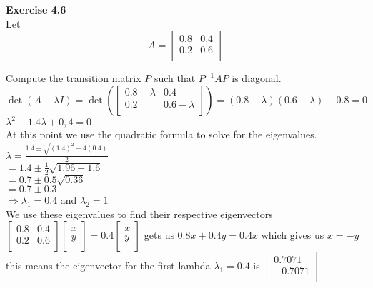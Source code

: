 \documentclass[letterpaper,12pt]{article}
\theoremstyle{definition}
\begin{document}
\textbf{Exercise 4.6}\\

Let \[A = 
\begin{bmatrix}
   0.8 & 0.4 \\
   0.2 & 0.6 \\
  \end{bmatrix} \]
 
 Compute the transition matrix $P$ such that $P^{-1}AP$ is diagonal.\\
 $\det(A -\lambda I) = \det\left(
 \begin{bmatrix}
   0.8 - \lambda & 0.4 \\
   0.2 & 0.6 - \lambda \\
  \end{bmatrix}\right) =
 (0.8 - \lambda)(0.6 - \lambda) - 0.8 =0$\\
 $\lambda^2 -1.4\lambda +0,4 = 0$\\
 At this point we use the quadratic formula to solve for the eigenvalues.\\
 $\lambda =   \frac{1.4 \pm \sqrt{(1.4)^2 -4(0.4)}}{  2        }$\\
  $ = 1.4 \pm \frac{1}{2}\sqrt{1.96 -1.6}       $\\
   $ = 0.7 \pm 0.5\sqrt{0.36}       $\\
      $ =  0.7 \pm 0.3      $\\
$ \Rightarrow \lambda_1 = 0.4$ and $\lambda_2 = 1$\\
We use these eigenvalues to find their respective eigenvectors\\
$\begin{bmatrix}
   0.8 & 0.4 \\
   0.2 & 0.6 \\
  \end{bmatrix} 
  \begin{bmatrix}
   x\\
   y\\
  \end{bmatrix} =
  0.4
  \begin{bmatrix}
   x\\
   y\\
  \end{bmatrix} $
gets us $0.8x + 0.4y = 0.4x$ which gives us $ x=-y$ this means the eigenvector for the first lambda $\lambda_1 = 0.4$ is $\begin{bmatrix}
   0.7071\\
   -0.7071\\
  \end{bmatrix} $
\end{document}
